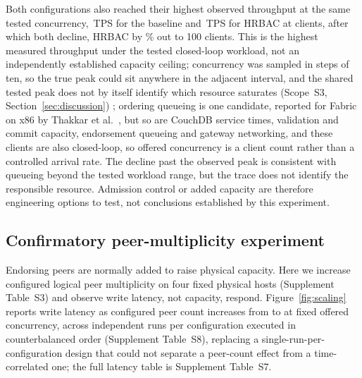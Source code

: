\documentclass[a4paper,fleqn]{cas-dc}
\begin{document}
Both configurations also reached their highest observed throughput at the
same tested concurrency, \PeakBaselineTPS\,TPS for the baseline and
\PeakHrbacTPS\,TPS for HRBAC at \KneeClients{} clients, after which both
decline, HRBAC by \PostKneeDeclinePct\% out to 100 clients. This is the
highest measured throughput under the tested closed-loop workload, not an
independently established capacity ceiling; concurrency was sampled in
steps of ten, so the true peak could sit anywhere in the adjacent
interval, and the shared tested peak does not by itself identify which
resource saturates (Scope~S3, Section~\ref{sec:discussion}) ;
ordering queueing is one candidate, reported for Fabric on x86 by
Thakkar et al.~\cite{thakkar2018performance}, but so are CouchDB service
times, validation and commit capacity, endorsement queueing and gateway
networking, and these clients are also closed-loop, so offered
concurrency is a client count rather than a controlled arrival rate. The
decline past the observed peak is consistent with queueing beyond the
tested workload range, but the trace does not identify the responsible
resource. Admission control or added capacity are therefore engineering
options to test, not conclusions established by this experiment.

\subsection{Confirmatory peer-multiplicity experiment}
\label{subsec:scaling}

Endorsing peers are normally added to raise physical capacity. Here we
increase configured logical peer multiplicity on four fixed physical
hosts (Supplement Table~S3) and observe write latency, not capacity,
respond. Figure~\ref{fig:scaling} reports write latency as configured peer
count increases from \ScaleMinPeers{} to \ScaleMaxPeers{} at fixed offered
concurrency, across \PartRunsPerConfig{} independent runs per configuration
executed in counterbalanced order (Supplement Table~S8), replacing a
  single-run-per-configuration design that could not separate a peer-count
  effect from a time-correlated one; the
full latency table is Supplement Table~S7.
\end{document}
